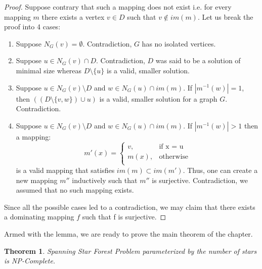\documentclass[en]{pracamgr}
\newtheorem{theorem}{Theorem}
\newcommand{\kssf}{\emph{Spanning Star Forest Problem} parameterized by the number of stars}
\begin{document}
\begin{proof}
	Suppose contrary that such a mapping does not exist i.e. for every mapping $m$ there exists a vertex $v \in D$ such that $v \notin im(m)$. Let us break the proof into 4 cases:
	\begin{enumerate}
		\item Suppose $N_G(v) = \emptyset$. Contradiction, $G$ has no isolated vertices.
		\item Suppose $u \in N_G(v) \cap D$. Contradiction, $D$ was said to be a solution of minimal size whereas $D \setminus \{u\}$ is a valid, smaller solution.
		\item Suppose $u \in N_{G}(v) \setminus D$ and $w \in N_G(u) \cap im(m)$. If $|m^{-1}(w)|=1$, then $((D \setminus \{v,w\}) \cup u)$ is a valid, smaller solution for a graph $G$. Contradiction.
		\item Suppose $u \in N_{G}(v) \setminus D$ and $w \in N_G(u) \cap im(m)$. If $|m^{-1}(w)| > 1$ then a mapping:
		\begin{equation*}
			m'(x) = \begin{cases}
			v, & \text{if x = u} \\
			m(x), &\text{otherwise} \\
			\end{cases}
		\end{equation*}
		is a valid mapping that satisfies $im(m) \subset im(m')$. Thus, one can create a new mapping $m''$ inductively such that $m''$ is surjective. Contradiction, we assumed that no such mapping exists. 
	\end{enumerate}
	
	Since all the possible cases led to a contradiction, we may claim that there exists a dominating mapping $f$ such that f is surjective.  
\end{proof}

Armed with the lemma, we are ready to prove the main theorem of the chapter.

\begin{theorem}\label{dom ssf}
	\kssf{} is NP-Complete.
\end{theorem}
\end{document}
